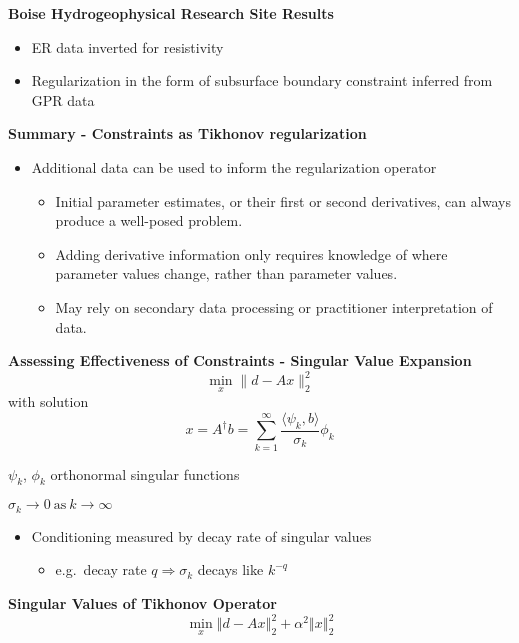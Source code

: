 \documentclass[
paper=A6,landscape,
fontsize=11pt, %
pagesize, %
parskip=half-, %
]{scrartcl} %
\theoremstyle{mythmstyle} %
\begin{document}
{\large \bf Boise Hydrogeophysical Research Site Results}


\begin{itemize}
\item ER data inverted for resistivity
\item Regularization in the form of
subsurface boundary constraint inferred from GPR data
\end{itemize}

\centerline{}
\clearpage


{\large \bf Summary -  Constraints as Tikhonov regularization}
\begin{itemize}
\item Additional data can be used to inform the regularization operator
\begin{itemize}
\item Initial parameter estimates, or their first or second derivatives,  can always produce a well-posed problem.
\item Adding derivative information only requires knowledge of where parameter values change, rather than parameter values.
\item May rely on secondary data processing or practitioner interpretation of data.
\end{itemize}
\end{itemize}
\clearpage
{\large \bf Assessing Effectiveness of Constraints - Singular Value Expansion}\\
\[ \min_x \| d-Ax  \|_2^2 \]
with solution 
\[ x = A^{\dagger} b = \sum_{k=1}^{\infty} \frac{\langle \psi_k , b \rangle }{\sigma_k} \phi_k \]
\centerline{ $\psi_k$, $\phi_k$ orthonormal singular functions}
\centerline{
$\sigma_k \rightarrow 0 \ \mbox{as} \ k \rightarrow \infty$}
\begin{itemize}
\item{Conditioning measured by decay rate of singular values}
\begin{itemize}
\item e.g.\ decay rate $q \Rightarrow \sigma_{k}$ decays like $k^{-q}$
\end{itemize}
\end{itemize}

\clearpage
{\large \bf Singular Values of Tikhonov Operator}
\[%
\min_x\left\Vert d-Ax\right\Vert _2^{2}+\alpha^2 \left\Vert x\right\Vert _2^{2}
\]
\end{document}
